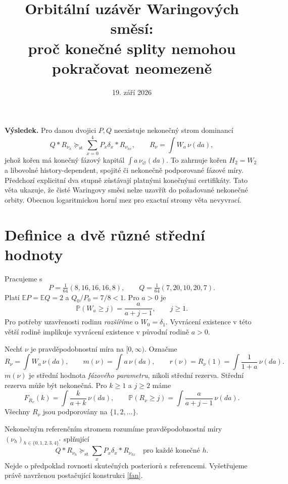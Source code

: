 \documentclass[11pt,a4paper]{article}
\title{Orbitální uzávěr Waringových směsí:\\proč konečné splity nemohou pokračovat neomezeně}
\author{}
\date{19. září 2026}
\newcommand{\E}{\mathbb E}
\newcommand{\Prb}{\mathbb P}
\newcommand{\st}{\mathrm{st}}
\begin{document}
\maketitle

\noindent\textbf{Výsledek.}
Pro danou dvojici $P,Q$ neexistuje nekonečný strom dominancí
\[
Q*R_{\nu_h}\succeq_{\st}
\sum_{x=0}^4P_x\delta_x*R_{\nu_{hx}},\qquad
R_\nu=\int W_a\,\nu(da),
\]
jehož kořen má konečný fázový kapitál $\int a\,\nu_\varnothing(da)$.
To zahrnuje kořen $H_2=W_2$ a libovolné history-dependent,
spojité či nekonečně podporované fázové míry.
Předchozí explicitní dva stupně zůstávají platnými konečnými
certifikáty. Tato věta ukazuje, že čisté Waringovy směsi nelze
uzavřít do požadované nekonečné orbity.
Obecnou logaritmickou horní mez pro exactní stromy věta nevyvrací.

\section{Definice a dvě různé střední hodnoty}
Pracujeme s
\[
P=\tfrac1{64}(8,16,16,16,8),\qquad
Q=\tfrac1{64}(7,20,10,20,7).
\]
Platí $\E P=\E Q=2$ a $Q_0/P_0=7/8<1$.
Pro $a>0$ je
\[
\Prb(W_a\ge j)=\frac{a}{a+j-1},\qquad j\ge1.
\]
Pro potřeby uzavřenosti rodinu \emph{rozšíříme} o $W_0=\delta_1$.
Vyvrácení existence v této větší rodině implikuje vyvrácení
existence v původní rodině $a>0$.

Nechť $\nu$ je pravděpodobnostní míra na $[0,\infty)$. Označme
\[
R_\nu=\int W_a\,\nu(da),\qquad
m(\nu)=\int a\,\nu(da),\qquad
r(\nu)=R_\nu(1)=\int\frac{1}{1+a}\,\nu(da).
\]
$m(\nu)$ je střední hodnota \emph{fázového parametru}, nikoli
střední rezerva. Střední rezerva může být nekonečná.
Pro $k\ge1$ a $j\ge2$ máme
\begin{equation}\label{cdf}
F_{R_\nu}(k)=\int\frac{k}{a+k}\,\nu(da),\qquad
\Prb(R_\nu\ge j)=\int\frac{a}{a+j-1}\,\nu(da).
\end{equation}
Všechny $R_\nu$ jsou podporovány na $\{1,2,\ldots\}$.

Nekonečným referenčním stromem rozumíme pravděpodobnostní míry
$(\nu_h)_{h\in\{0,1,2,3,4\}^*}$ splňující
\begin{equation}\label{fan}
Q*R_{\nu_h}\succeq_{\st}
\sum_xP_x\delta_x*R_{\nu_{hx}}
\quad\text{pro každé konečné }h.
\end{equation}
Nejde o předpoklad rovnosti skutečných posteriorů s referencemi.
Vyšetřujeme právě navrženou postačující konstrukci \eqref{fan}.
\end{document}
